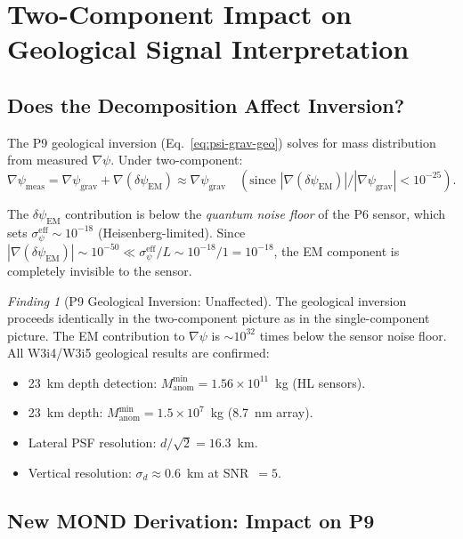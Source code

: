 \documentclass[11pt]{article}
\theoremstyle{definition}
\theoremstyle{remark}
\newtheorem{finding}[theorem]{Finding}
\newcommand{\ee}[1]{\times10^{#1}}
\newcommand{\psigrav}{\psi_{\mathrm{grav}}}
\newcommand{\dpsiem}{\delta\psi_{\mathrm{EM}}}
\begin{document}
\section{Two-Component Impact on Geological Signal Interpretation}
\label{sec:P9-interpretation}

\subsection{Does the Decomposition Affect Inversion?}

The P9 geological inversion (Eq.~\ref{eq:psi-grav-geo}) solves for
mass distribution from measured $\nabla\psi$. Under two-component:
\begin{equation}
\nabla\psi_{\mathrm{meas}} = \nabla\psigrav + \nabla(\dpsiem)
\approx \nabla\psigrav \quad (\text{since } |\nabla(\dpsiem)|/|\nabla\psigrav|
< 10^{-25}).
\end{equation}

The $\dpsiem$ contribution is below the \emph{quantum noise floor} of
the P6 sensor, which sets $\sigma_\psi^{\mathrm{eff}} \sim 10^{-18}$
(Heisenberg-limited). Since $|\nabla(\dpsiem)| \sim 10^{-50} \ll
\sigma_\psi^{\mathrm{eff}}/L \sim 10^{-18}/1 = 10^{-18}$, the EM
component is completely invisible to the sensor.

\begin{finding}[P9 Geological Inversion: Unaffected]
\label{finding:P9-inversion}
The geological inversion proceeds identically in the two-component
picture as in the single-component picture. The EM contribution to
$\nabla\psi$ is $\sim 10^{32}$ times below the sensor noise floor.
All W3i4/W3i5 geological results are confirmed:
\begin{itemize}[nosep]
\item 23~km depth detection: $M_{\mathrm{anom}}^{\min} = 1.56\ee{11}$~kg
  (HL sensors).
\item 23~km depth: $M_{\mathrm{anom}}^{\min} = 1.5\ee{7}$~kg
  (8.7~nm array).
\item Lateral PSF resolution: $d/\sqrt{2} = 16.3$~km.
\item Vertical resolution: $\sigma_d \approx 0.6$~km at SNR~$= 5$.
\end{itemize}
\end{finding}

\subsection{New MOND Derivation: Impact on P9}
\end{document}
